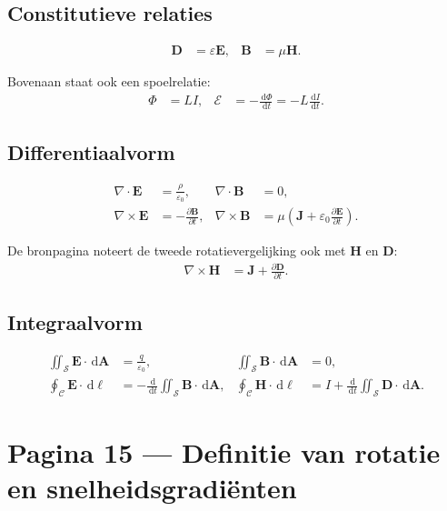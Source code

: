 \documentclass[11pt]{article}
\newcommand{\dd}{\,\mathrm{d}}
\newcommand{\vect}[1]{\mathbf{#1}}
\begin{document}
\subsection*{Constitutieve relaties}

\begin{align*}
\vect{D}
  &=
  \varepsilon\vect{E},
&
\vect{B}
  &=
  \mu\vect{H}.
\end{align*}

Bovenaan staat ook een spoelrelatie:
\begin{align*}
\Phi
  &=
  LI,
&
\mathcal{E}
  &=
  -\frac{\dd\Phi}{\dd t}
   =
  -L\frac{\dd I}{\dd t}.
\end{align*}

\subsection*{Differentiaalvorm}

\begin{align*}
\nabla\cdot\vect{E}
  &=
  \frac{\rho}{\varepsilon_0},
&
\nabla\cdot\vect{B}
  &=
  0,
\\
\nabla\times\vect{E}
  &=
  -\frac{\partial\vect{B}}{\partial t},
&
\nabla\times\vect{B}
  &=
  \mu
  \left(
  \vect{J}
  +
  \varepsilon_0\frac{\partial\vect{E}}{\partial t}
  \right).
\end{align*}

De bronpagina noteert de tweede rotatievergelijking ook met $\vect{H}$ en $\vect{D}$:
\begin{align*}
\nabla\times\vect{H}
  &=
  \vect{J}
  +
  \frac{\partial\vect{D}}{\partial t}.
\end{align*}

\subsection*{Integraalvorm}

\begin{align*}
\iint_{\mathcal{S}}\vect{E}\cdot\dd\vect{A}
  &=
  \frac{q}{\varepsilon_0},
&
\iint_{\mathcal{S}}\vect{B}\cdot\dd\vect{A}
  &=
  0,
\\
\oint_{\mathcal{C}}\vect{E}\cdot\dd\vect{\ell}
  &=
  -\frac{\dd}{\dd t}
  \iint_{\mathcal{S}}\vect{B}\cdot\dd\vect{A},
&
\oint_{\mathcal{C}}\vect{H}\cdot\dd\vect{\ell}
  &=
  I
  +
  \frac{\dd}{\dd t}
  \iint_{\mathcal{S}}\vect{D}\cdot\dd\vect{A}.
\end{align*}

\section*{Pagina 15 --- Definitie van rotatie en snelheidsgradiënten}
\end{document}
